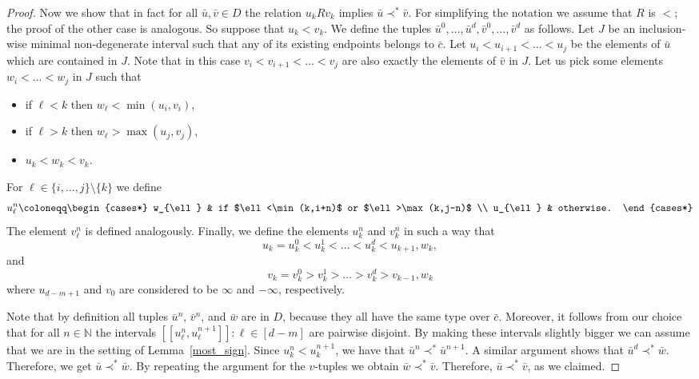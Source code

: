 \documentclass{amsart}
\theoremstyle{definition}
\theoremstyle{remark}
\numberwithin{equation}{section}
\newcommand\green[1]{\textcolor{green!50!black}{#1}}
\newcommand{\pau}[1]{\textcolor{blue}{#1}}
\begin{document}
\begin{proof}
	Now we show that in fact for all $\bar{u},\bar{v}\in D$ the relation $u_kRv_k$ implies $\bar{u}\prec^*\bar{v}$. For simplifying the notation we assume that $R$ is $<$; the proof of the other case is analogous. So suppose that $u_k < v_k$. We define the tuples $\bar{u}^0,\dots,\bar{u}^d,\bar{v}^0,\dots,\bar{v}^d$
    as follows. Let $J$
    be an inclusion-wise minimal non-degenerate interval {such that any of its existing endpoints belongs to $\bar{c}$.}
   Let $u_i<u_{i+1}<\dots<u_j$ be the elements of $\bar{u}$ which are contained in $J$. Note that in this case $v_i<v_{i+1}<\dots<v_j$ are also exactly the elements of $\bar{v}$ in $J$. Let us pick some elements $w_i<\dots<w_j$ {in $J$} such that
	
\begin{itemize}
\item if $\ell<k$ then $w_{\ell}<\min(u_i,v_i)$,
\item if $\ell>k$ then $w_{\ell}>\max(u_j,v_j)$,
\item $u_k<w_k<v_k$.
\end{itemize}
For $\ell\in \{i,\dots,j\} \setminus \{k\}$ we define
\[
u^n_{\ell}\coloneqq 
\begin{cases*}
w_{\ell} & if $\ell<\min(k,i+n)$ or $\ell>\max(k,j-n)$ \\
u_{\ell} & otherwise.
\end{cases*}
\]
	The element $v^n_{\ell}$ is defined analogously. Finally, we define the elements $u^n_k$ and $v^n_k$ in such a way that
\[
u_k=u^0_k<u^1_k<\dots<u^d_k<u_{k+1},w_k,
\]
	and
\[
v_k=v^0_k>v^1_k>\dots>v^d_k>v_{k-1},w_k
\]
	{where $u_{d-m+1}$ and $v_0$ are considered to be $\infty$ and $-\infty$, respectively.}

	Note that by definition all tuples $\bar{u}^n$, $\bar{v}^n$, and $\bar{w}$ are in $D$, because they all have the same type over $\bar{c}$. Moreover, it follows from our choice that for all $n\in \mathbb{N}$ the intervals $[[u^n_{\ell},u^{n+1}_{\ell}]]: \ell\in [d-m]$ are pairwise disjoint. By making these intervals slightly bigger {we can assume that} we are in the setting of Lemma~\ref{most_sign}. Since ${u^n_k<u^{n+1}_k}$, we have that $\bar{u}^n\prec^*\bar{u}^{n+1}$. A similar argument shows that $\bar{u}^d\prec^*\bar{w}$. Therefore, we get $\bar{u}\prec^*\bar{w}$. By repeating the argument for the $v$-tuples we obtain $\bar{w}\prec^*\bar{v}$. Therefore, $\bar{u}\prec^*\bar{v}$, as we claimed.


\end{proof}
\end{document}
